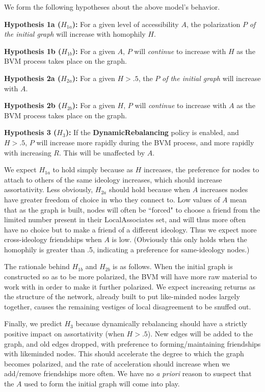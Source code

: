 
\label{sec:hypos}

We form the following hypotheses about the above model's behavior.

\begin{description}

\item{\textbf{Hypothesis 1a ($H_{1a}$):}} For a given level of accessibility
$A$, the polarization $P$ \textit{of the initial graph} will increase with
homophily $H$.

\item{\textbf{Hypothesis 1b ($H_{1b}$):}} For a given $A$, $P$ will
\textit{continue} to increase with $H$ as the BVM process takes place on the
graph.

\item{\textbf{Hypothesis 2a ($H_{2a}$):}} For a given $H>.5$, the $P$ \textit{of
the initial graph} will increase with $A$.

\item{\textbf{Hypothesis 2b ($H_{2b}$):}} For a given $H$, $P$ will
\textit{continue} to increase with $A$ as the BVM process takes place on the
graph.

\item{\textbf{Hypothesis 3 ($H_3$):}} If the \textbf{DynamicRebalancing}
policy is enabled, and $H>.5$, $P$ will increase more rapidly during the BVM
process, and more rapidly with increasing $R$. This will be unaffected by $A$.

\end{description}

We expect $H_{1a}$ to hold simply because as $H$ increases, the preference for
nodes to attach to others of the same ideology increases, which should
increase assortativity. Less obviously, $H_{2a}$ should hold because when $A$
increases nodes have greater freedom of choice in who they connect to. Low
values of $A$ mean that as the graph is built, nodes will often be ``forced"
to choose a friend from the limited number present in their LocalAssociates
set, and will thus more often have no choice but to make a friend of a
different ideology. Thus we expect more cross-ideology friendships when $A$ is
low. (Obviously this only holds when the homophily is greater than .5,
indicating a preference for same-ideology nodes.)

The rationale behind $H_{1b}$ and $H_{2b}$ is as follows. When the initial
graph is constructed so as to be more polarized, the BVM will have more raw
material to work with in order to make it further polarized. We expect
increasing returns as the structure of the network, already built to put
like-minded nodes largely together, causes the remaining vestiges of local
disagreement to be snuffed out.

Finally, we predict $H_3$ because dynamically rebalancing should have a
strictly positive impact on assortativity (when $H>.5$). New edges will be
added to the graph, and old edges dropped, with preference to
forming/maintaining friendships with likeminded nodes. This should accelerate
the degree to which the graph becomes polarized, and the rate of acceleration
should increase when we add/remove friendships more often. We have no
\textit{a priori} reason to suspect that the $A$ used to form the initial
graph will come into play.
